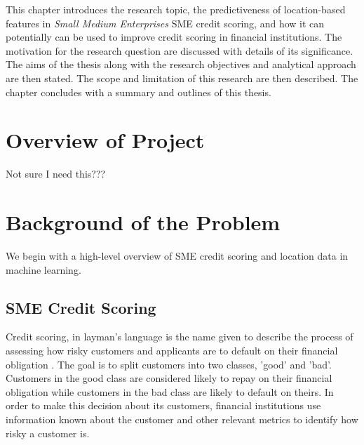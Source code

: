 This chapter introduces the research topic, the predictiveness of location-based features in \textit{Small Medium Enterprises} SME credit scoring, and how it can potentially can be used to improve credit scoring in financial institutions. The motivation for the research question are discussed with details of its significance. The aims of the thesis along with the research objectives and analytical approach are then stated. The scope and limitation of this research are then described. The chapter concludes with a summary and outlines of this thesis.



\section{Overview of Project}
Not sure I need this???


\section{Background of the Problem}

We begin with a high-level overview of SME credit scoring and location data in machine learning.

\subsection{SME Credit Scoring}

Credit scoring, in layman's language is the name given to describe the process of assessing how risky customers and applicants are to default on their financial obligation \citep{hand_statistical_1997}. The goal is to split customers into two classes, 'good' and 'bad'. Customers in the good class are considered likely to repay on their financial obligation while customers in the bad class are likely to default on theirs. In order to make this decision about its customers, financial institutions use information known about the customer and other relevant metrics to identify how risky a customer is. 



